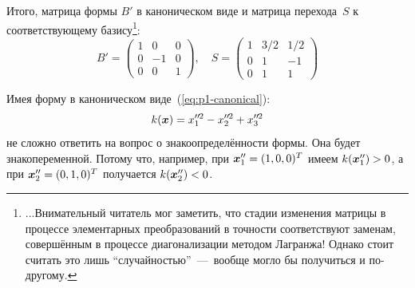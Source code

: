 \documentclass[a4paper,12pt]{article}
\newcommand*{\dprime}{{\prime\prime}\mkern-1.2mu}
\begin{document}
\begin{solution}
    Итого, матрица формы $B'$ в каноническом виде и матрица перехода~$S$ к соответствующему базису\footnote{
    ...Внимательный читатель мог заметить, что стадии изменения матрицы в процессе элементарных преобразований в точности соответствуют заменам, совершённым в процессе диагонализации методом Лагранжа!
    Однако стоит считать это лишь ``случайностью''~---~вообще могло бы получиться и по-другому.}:
    \[
      B' = \begin{pmatrix}
        1 & 0  & 0\\
        0 & -1 & 0\\
        0 & 0  & 1
      \end{pmatrix},\quad S = \begin{pmatrix}
        1 & 3/2 & 1/2\\
        0 & 1   & -1\\
        0 & 1   & 1
      \end{pmatrix}
    \]
    
    \bigskip
    
    Имея форму в каноническом виде~(\ref{eq:p1-canonical}):
    \[
      k(\bds x) = x_1^{\dprime 2} - x_2^{\dprime 2} + x_3^{\dprime 2}
    \]
    не сложно ответить на вопрос о знакоопределённости формы.
    Она будет знакопеременной.
    Потому что, например, при $\bds x_1'' \hm= (1, 0, 0)^T$ имеем $k(\bds x_1'') \hm> 0$, а при $\bds x_2'' \hm= (0, 1, 0)^T$ получается $k(\bds x_2'') \hm< 0$.
  \end{solution}
\end{document}
